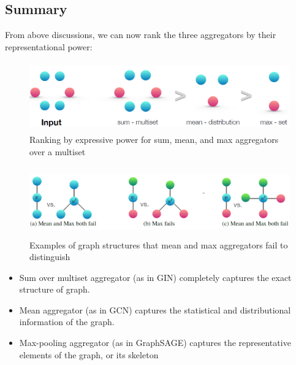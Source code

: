 \subsection{Summary}

From above discussions, we can now rank the three aggregators by their representational power:

\begin{figure}[hbt]
\centering
  \includegraphics[height=3cm]{results/fig/fig3.png}
  \caption{Ranking by expressive power for sum, mean, and max aggregators over a multiset}
\end{figure}

\begin{figure}[hbt]
\centering
  \includegraphics[height=3cm]{results/fig/fig4.png}
  \caption{Examples of graph structures that mean and max aggregators fail to distinguish}
\end{figure}

\begin{itemize}
	\item Sum over multiset aggregator (as in GIN) completely captures the exact structure of graph.
		
	\item Mean aggregator (as in GCN) captures the statistical and distributional information of the graph.
	
	\item Max-pooling aggregator (as in GraphSAGE) captures the representative elements of the graph, or its skeleton
\end{itemize}